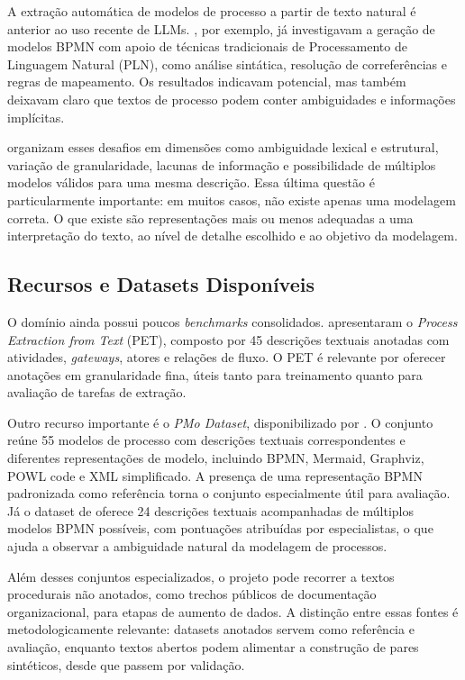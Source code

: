 A extração automática de modelos de processo a partir de texto natural é anterior ao uso recente de LLMs. , por exemplo, já investigavam a geração de modelos BPMN com apoio de técnicas tradicionais de Processamento de Linguagem Natural (PLN), como análise sintática, resolução de correferências e regras de mapeamento. Os resultados indicavam potencial, mas também deixavam claro que textos de processo podem conter ambiguidades e informações implícitas.

 organizam esses desafios em dimensões como ambiguidade lexical e estrutural, variação de granularidade, lacunas de informação e possibilidade de múltiplos modelos válidos para uma mesma descrição. Essa última questão é particularmente importante: em muitos casos, não existe apenas uma modelagem correta. O que existe são representações mais ou menos adequadas a uma interpretação do texto, ao nível de detalhe escolhido e ao objetivo da modelagem.

\subsection{Recursos e Datasets Disponíveis}
\label{subsec:nl-datasets}

O domínio ainda possui poucos \textit{benchmarks} consolidados.  apresentaram o \textit{Process Extraction from Text} (PET), composto por 45 descrições textuais anotadas com atividades, \textit{gateways}, atores e relações de fluxo. O PET é relevante por oferecer anotações em granularidade fina, úteis tanto para treinamento quanto para avaliação de tarefas de extração.

Outro recurso importante é o \textit{PMo Dataset}, disponibilizado por . O conjunto reúne 55 modelos de processo com descrições textuais correspondentes e diferentes representações de modelo, incluindo BPMN, Mermaid, Graphviz, POWL code e XML simplificado. A presença de uma representação BPMN padronizada como referência torna o conjunto especialmente útil para avaliação. Já o dataset de  oferece 24 descrições textuais acompanhadas de múltiplos modelos BPMN possíveis, com pontuações atribuídas por especialistas, o que ajuda a observar a ambiguidade natural da modelagem de processos.

Além desses conjuntos especializados, o projeto pode recorrer a textos procedurais não anotados, como trechos públicos de documentação organizacional, para etapas de aumento de dados. A distinção entre essas fontes é metodologicamente relevante: datasets anotados servem como referência e avaliação, enquanto textos abertos podem alimentar a construção de pares sintéticos, desde que passem por validação.

